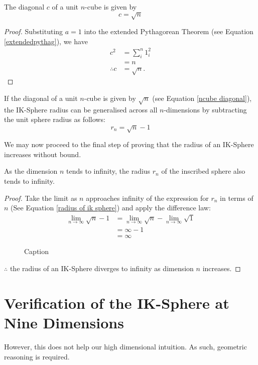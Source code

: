 \begin{corollary} The diagonal $c$ of a unit $n$-cube is given by
\begin{equation} \label{ncube diagonal}
    c = \sqrt{n}
\end{equation}
\end{corollary}
\begin{proof}
    Substituting $a=1$ into the extended Pythagorean Theorem (see Equation \ref{extendedpythag}), we have
    \begin{align*}
        c^2 &= \sum_{i}^{n}1_i^2\\
        &=n\\
        \therefore c &= \sqrt{n}.
    \end{align*}
\end{proof}

If the diagonal of a unit $n$-cube is given by $\sqrt{n}$ (see Equation \ref{ncube diagonal}), the IK-Sphere radius can be generalised across all $n$-dimensions by subtracting the unit sphere radius as follows:
\begin{equation}\label{radius of ik sphere}
    r_n = \sqrt{n}-1
\end{equation}

We may now proceed to the final step of proving that the radius of an IK-Sphere increases without bound.

\begin{theorem}
As the dimension $n$ tends to infinity, the radius $r_n$ of the inscribed sphere also tends to infinity.
\end{theorem}
\begin{proof}
Take the limit as $n$ approaches infinity of the expression for $r_n$ in terms of $n$ (See Equation \ref{radius of ik sphere}) and apply the difference law:
\begin{align*}
    \lim_{n\to\infty} \sqrt{n}-1 &= \lim_{n\to\infty} \sqrt{n} - \lim_{n\to\infty} \sqrt{1}\\
    &=\infty - 1\\
    &=\infty
\end{align*}
\begin{figure}[h]
    \centering
    \caption{Caption}
    \label{fig:radius increases graph}
\end{figure}
    

$\therefore$ the radius of an IK-Sphere diverges to infinity as dimension $n$ increases.
\end{proof}




\section{Verification of the IK-Sphere at Nine Dimensions}
However, this does not help our high dimensional intuition. As such, geometric reasoning is required.

